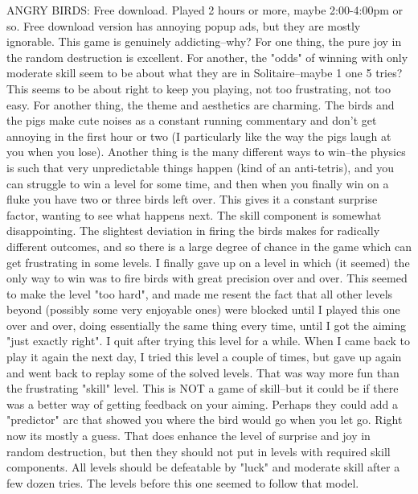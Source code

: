 \documentclass[]{article}
\begin{document}
ANGRY BIRDS: Free download.  Played 2 hours or more, maybe 2:00-4:00pm
or so.  Free download version has annoying popup ads, but they are
mostly ignorable.  This game is genuinely addicting--why?  For one
thing, the pure joy in the random destruction is excellent.  For
another, the "odds" of winning with only moderate skill seem to be
about what they are in Solitaire--maybe 1 one 5 tries?  This seems to
be about right to keep you playing, not too frustrating, not too easy.
For another thing, the theme and aesthetics are charming.  The birds
and the pigs make cute noises as a constant running commentary and
don't get annoying in the first hour or two (I particularly like the
way the pigs laugh at you when you lose).  Another thing is the many
different ways to win--the physics is such that very unpredictable
things happen (kind of an anti-tetris), and you can struggle to win a
level for some time, and then when you finally win on a fluke you have
two or three birds left over.  This gives it a constant surprise
factor, wanting to see what happens next.  The skill component is
somewhat disappointing.  The slightest deviation in firing the birds
makes for radically different outcomes, and so there is a large degree
of chance in the game which can get frustrating in some levels.  I
finally gave up on a level in which (it seemed) the only way to win
was to fire birds with great precision over and over.  This seemed to
make the level "too hard", and made me resent the fact that all other
levels beyond (possibly some very enjoyable ones) were blocked until I
played this one over and over, doing essentially the same thing every
time, until I got the aiming "just exactly right".  I quit after
trying this level for a while.  When I came back to play it again the
next day, I tried this level a couple of times, but gave up again and
went back to replay some of the solved levels.  That was way more fun
than the frustrating "skill" level.  This is NOT a game of skill--but
it could be if there was a better way of getting feedback on your
aiming.  Perhaps they could add a "predictor" arc that showed you
where the bird would go when you let go.  Right now its mostly a
guess.  That does enhance the level of surprise and joy in random
destruction, but then they should not put in levels with required
skill components.  All levels should be defeatable by "luck" and
moderate skill after a few dozen tries.  The levels before this one
seemed to follow that model.
\end{document}
